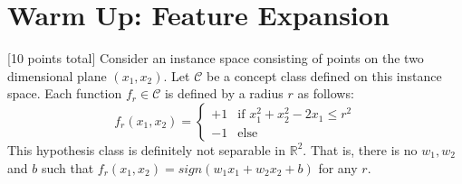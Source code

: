\section{Warm Up: Feature Expansion}
\label{sec:feature-expansion}

[10 points total] Consider an instance space consisting of points on
the two dimensional plane $(x_1,x_2)$. Let $\mathcal{C}$ be a concept
class defined on this instance space. Each function
$f_r \in \mathcal{C}$ is defined by a radius $r$ as follows:
\[
f_r(x_1, x_2) = 
\begin{cases}
  +1  & \text{if } x_1^2 +x_2^2 - 2x_1 \leq r^2 \\
  -1 & \text{else}
\end{cases}
\]
This hypothesis class is definitely not separable in $\mathbb{R}^2$.
That is, there is no $w_1, w_2$ and $b$ such that $f_r(x_1, x_2) =
sign(w_1 x_1 + w_2 x_2 + b)$ for any $r$. 

